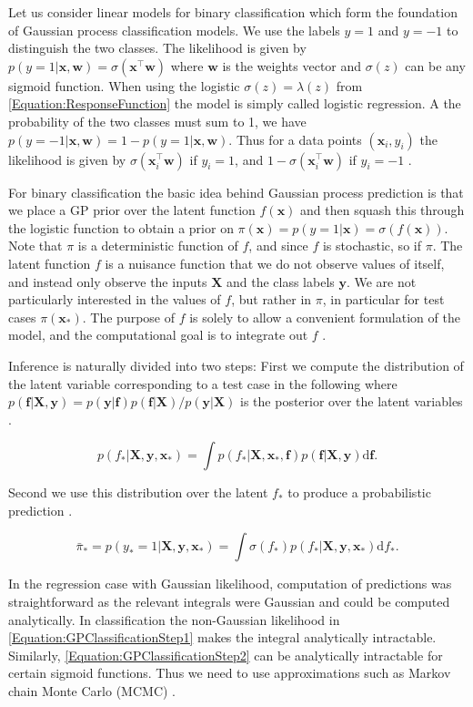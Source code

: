 \documentclass[../../../main.tex]{subfiles}
\begin{document}
Let us consider linear models for binary classification which form the foundation of Gaussian process classification models. We use the labels $y=1$ and $y=-1$ to distinguish the two classes. The likelihood is given by $p(y=1|\bm{x},\bm{w}) = \sigma(\bm{x}^\top\bm{w})$ where $\bm{w}$ is the weights vector and $\sigma(z)$ can be any sigmoid function. When using the logistic $\sigma(z)=\lambda(z)$ from \autoref{Equation:ResponseFunction} the model is simply called logistic regression. A the probability of the two classes must sum to 1, we have $p(y=-1|\bm{x},\bm{w})=1-p(y=1|\bm{x},\bm{w})$. Thus for a data points $(\bm{x}_i,y_i)$ the likelihood is given by $\sigma(\bm{x}_i^\top\bm{w})$ if $y_i=1$, and $1-\sigma(\bm{x}_i^\top\bm{w})$ if $y_i=-1$ \autocite{Rasmussen2005}.

For binary classification the basic idea behind Gaussian process prediction is that we place a GP prior over the latent function $f(\bm{x})$ and then squash this through the logistic function to obtain a prior on $\pi(\bm{x})=p(y=1|\bm{x})=\sigma(f(\bm{x}))$. Note that $\pi$ is a deterministic function of $f$, and since $f$ is stochastic, so if $\pi$. The latent function $f$ is a nuisance function that we do not observe values of itself, and instead only observe the inputs $\bm{X}$ and the class labels $\bm{y}$. We are not particularly interested in the values of $f$, but rather in $\pi$, in particular for test cases $\pi(\bm{x}_\ast)$. The purpose of $f$ is solely to allow a convenient formulation of the model, and the computational goal is to integrate out $f$ \autocite{Rasmussen2005}.

Inference is naturally divided into two steps: First we compute the distribution of the latent variable corresponding to a test case in the following where $p(\bm{f}|\bm{X},\bm{y})=p(\bm{y}|\bm{f})p(\bm{f}|\bm{X})/p(\bm{y}|\bm{X})$ is the posterior over the latent variables \autocite{Rasmussen2005}.

\begin{equation}
p(f_\ast|\bm{X},\bm{y},\bm{x}_\ast) = \int p(f_\ast|\bm{X},\bm{x}_\ast,\bm{f})p(\bm{f}|\bm{X},\bm{y})\mathrm{d}\bm{f}.
\label{Equation:GPClassificationStep1}
\end{equation}

Second we use this distribution over the latent $f_\ast$ to produce a probabilistic prediction \autocite{Rasmussen2005}.

\begin{equation}
\bar{\pi}_\ast = p(y_\ast=1|\bm{X},\bm{y},\bm{x}_\ast) = \int \sigma(f_\ast)p(f_\ast|\bm{X},\bm{y},\bm{x}_\ast)\mathrm{d}f_\ast.
\label{Equation:GPClassificationStep2}
\end{equation}

In the regression case with Gaussian likelihood, computation of predictions was straightforward as the relevant integrals were Gaussian and could be computed analytically. In classification the non-Gaussian likelihood in \autoref{Equation:GPClassificationStep1} makes the integral analytically intractable. Similarly, \autoref{Equation:GPClassificationStep2} can be analytically intractable for certain sigmoid functions. Thus we need to use approximations such as Markov chain Monte Carlo (MCMC) \autocite{Rasmussen2005}.
\end{document}
